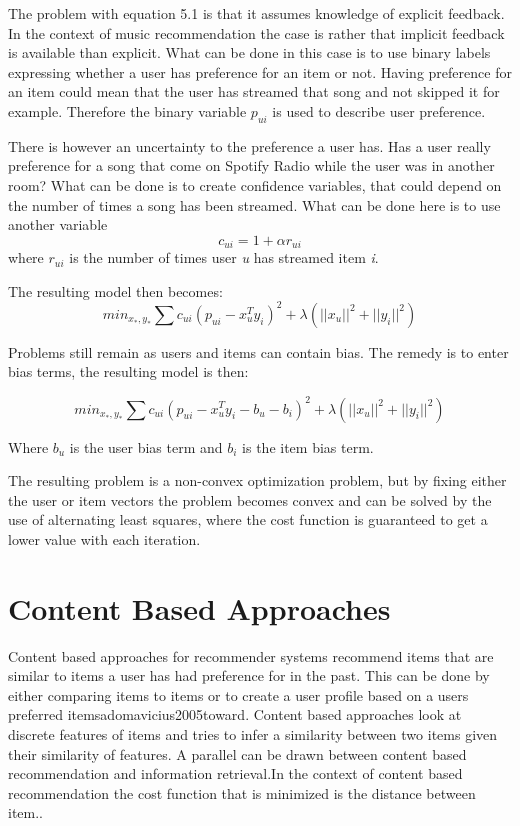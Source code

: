 The problem with equation 5.1 is that it assumes knowledge of explicit feedback. In the context of music recommendation the case is rather that implicit feedback is available than explicit. What can be done in this case is to use binary labels expressing whether a user has preference for an item or not. Having preference for an item could mean that the user has streamed that song and not skipped it for example. Therefore the binary variable $p_{ui}$ is used to describe user preference.

There is however an uncertainty to the preference a user has. Has a user really preference for a song that come on Spotify Radio while the user was in another room? What can be done is to create confidence variables, that could depend on the number of times a song has been streamed. What can be done here is to use another variable \[ c_{ui} = 1 + \alpha r_{ui} \] where $r_{ui}$ is the number of times user \textit{u} has streamed item \textit{i}.

The resulting model then becomes:
\begin{equation}
min_{x_*,y_*} \sum c_{ui}(p_{ui} - x_u^Ty_i)^2 +  \lambda(||x_u||^2 + ||y_i||^2)
\end{equation}

Problems still remain as users and items can contain bias. The remedy is to enter bias terms, the resulting model is then:

\begin{equation}
min_{x_*,y_*} \sum c_{ui}(p_{ui} - x_u^Ty_i - b_u - b_i)^2 +  \lambda(||x_u||^2 + ||y_i||^2)
\end{equation}

Where $b_u$ is the user bias term and $b_i$ is the item bias term.

The resulting problem is a non-convex optimization problem, but by fixing either the user or item vectors the problem becomes convex and can be solved by the use of alternating least squares, where the cost function is guaranteed to get a lower value with each iteration\cite{hu2008collaborative}.

\section{Content Based Approaches}
Content based approaches for recommender systems recommend items that are similar to items  a user has had preference for in the past. This can be done by either comparing items to items or to create a user profile based on a users preferred items{adomavicius2005toward}. Content based approaches look at discrete features of items and tries to infer a similarity between two items given their similarity of features. A parallel can be drawn between content based recommendation and information retrieval.In the context of content based recommendation the cost function that is minimized is the distance between item.\cite{adomavicius2005toward}.


